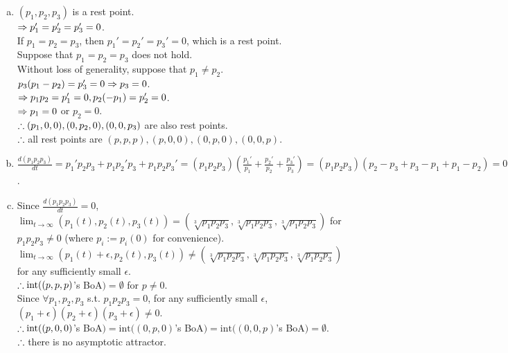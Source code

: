 \begin{pr}$ $
\begin{enumerate}[(a)]
\item $(p_1, p_2, p_3)$ is a rest point.\\
$\Rightarrow p_1'=p_2'=p_3'=0$.\\
If $p_1=p_2=p_3$, then $p_1'=p_2'=p_3'=0$, which is a rest point.\\
Suppose that $p_1=p_2=p_3$ does not hold.\\
Without loss of generality, suppose that $p_1\neq p_2$.\\
$p_3(p_1-p_2)=p_3'=0\Rightarrow p_3=0$.\\
$\Rightarrow p_1p_2=p_1'=0, p_2(-p_1)=p_2'=0$.\\
$\Rightarrow p_1=0$ or $p_2=0$.\\
$\therefore(p_1, 0, 0), (0, p_2, 0), (0, 0, p_3)$ are also rest points.\\
$\therefore$ all rest points are $(p, p, p), (p, 0, 0), (0, p, 0), (0, 0, p)$.
\item $\frac{d(p_1p_2p_3)}{dt}=p_1'p_2p_3+p_1p_2'p_3+p_1p_2p_3'=(p_1p_2p_3)\left(\frac{p_1'}{p_1}+\frac{p_2'}{p_2}+\frac{p_3'}{p_3}\right)=(p_1p_2p_3)(p_2-p_3+p_3-p_1+p_1-p_2)=0$.
\item Since $\frac{d(p_1p_2p_3)}{dt}=0$, $\lim_{t\to\infty}(p_1(t), p_2(t), p_3(t))=(\sqrt[3]{p_1p_2p_3}, \sqrt[3]{p_1p_2p_3}, \sqrt[3]{p_1p_2p_3})$ for $p_1p_2p_3\neq0$ (where $p_i:=p_i(0)$ for convenience).\\
$\lim_{t\to\infty}(p_1(t)+\epsilon, p_2(t), p_3(t))\neq(\sqrt[3]{p_1p_2p_3}, \sqrt[3]{p_1p_2p_3}, \sqrt[3]{p_1p_2p_3})$ for any sufficiently small $\epsilon$.\\
$\therefore\mathrm{int}((p, p, p)$'s BoA$)=\emptyset$ for $p\neq0$.\\
Since $\forall p_1, p_2, p_3$ s.t. $p_1p_2p_3=0$, for any sufficiently small $\epsilon$, $(p_1+\epsilon)(p_2+\epsilon)(p_3+\epsilon)\neq0$.\\
$\therefore\mathrm{int}((p, 0, 0)$'s BoA$)=\mathrm{int}((0, p, 0)$'s BoA$)=\mathrm{int}((0, 0, p)$'s BoA$)=\emptyset$.\\
$\therefore$ there is no asymptotic attractor.
\end{enumerate}
\end{pr}
